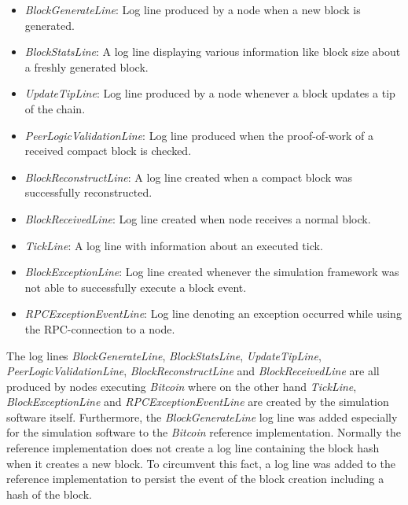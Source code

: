 \begin{itemize}
   \item \textit{BlockGenerateLine}: Log line produced by a node when a new block is generated.
   \item \textit{BlockStatsLine}: A log line displaying various information like block size about a freshly generated block.
   \item \textit{UpdateTipLine}: Log line produced by a node whenever a block updates a tip of the chain.
   \item \textit{PeerLogicValidationLine}: Log line produced when the proof-of-work of a received compact block is checked.  
   \item \textit{BlockReconstructLine}: A log line created when a compact block was successfully reconstructed.
   \item \textit{BlockReceivedLine}: Log line created when node receives a normal block.
   \item \textit{TickLine}: A log line with information about an executed tick.
   \item \textit{BlockExceptionLine}: Log line created whenever the simulation framework was not able to successfully execute a block event.
   \item \textit{RPCExceptionEventLine}: Log line denoting an exception occurred while using the RPC-connection to a node.
\end{itemize}

The log lines \textit{BlockGenerateLine}, \textit{BlockStatsLine}, \textit{UpdateTipLine}, \textit{PeerLogicValidationLine}, \textit{BlockReconstructLine} and \textit{BlockReceivedLine} are all produced by nodes executing \textit{Bitcoin} where on the other hand \textit{TickLine}, \textit{BlockExceptionLine} and \textit{RPCExceptionEventLine} are created by the simulation software itself.
Furthermore, the \textit{BlockGenerateLine} log line was added especially for the simulation software to the \textit{Bitcoin} reference implementation.
Normally the reference implementation does not create a log line containing the block hash when it creates a new block.
To circumvent this fact, a log line was added to the reference implementation to persist the event of the block creation including a hash of the block.

